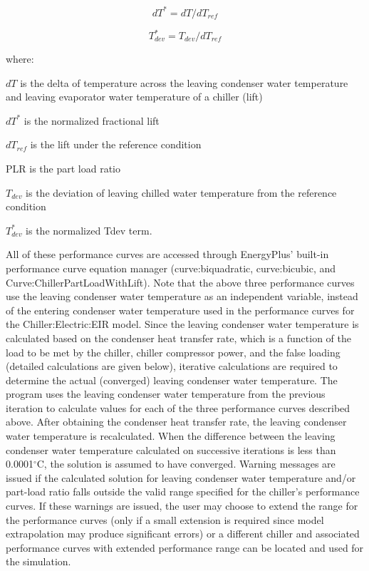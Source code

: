 \begin{equation}
dT^* = dT / dT_{ref}
\end{equation}

\begin{equation}
T_{dev}^* = T_{dev} / dT_{ref}
\end{equation}

where:

\(dT\) is the delta of temperature across the leaving condenser water temperature and leaving evaporator water temperature of a chiller (lift)

\(dT^*\) is the normalized fractional lift

\(dT_{ref}\) is the lift under the reference condition

PLR is the part load ratio

\(T_{dev}\) is the deviation of leaving chilled water temperature from the reference condition

\(T_{dev}^*\) is the normalized Tdev term.

All of these performance curves are accessed through EnergyPlus' built-in performance curve equation manager (curve:biquadratic, curve:bicubic, and Curve:ChillerPartLoadWithLift). Note that the above three performance curves use the leaving condenser water temperature as an independent variable, instead of the entering condenser water temperature used in the performance curves for the Chiller:Electric:EIR model. Since the leaving condenser water temperature is calculated based on the condenser heat transfer rate, which is a function of the load to be met by the chiller, chiller compressor power, and the false loading (detailed calculations are given below), iterative calculations are required to determine the actual (converged) leaving condenser water temperature. The program uses the leaving condenser water temperature from the previous iteration to calculate values for each of the three performance curves described above. After obtaining the condenser heat transfer rate, the leaving condenser water temperature is recalculated. When the difference between the leaving condenser water temperature calculated on successive iterations is less than 0.0001\(^{\circ}\)C, the solution is assumed to have converged. Warning messages are issued if the calculated solution for leaving condenser water temperature and/or part-load ratio falls outside the valid range specified for the chiller's performance curves. If these warnings are issued, the user may choose to extend the range for the performance curves (only if a small extension is required since model extrapolation may produce significant errors) or a different chiller and associated performance curves with extended performance range can be located and used for the simulation.

